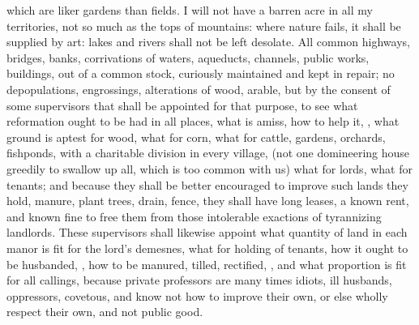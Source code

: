\etc{} which are liker gardens than fields. I will not have a barren acre in
all my territories, not so much as the tops of mountains: where nature fails,
it shall be supplied by art: lakes and rivers shall not be
left desolate. All common highways, bridges, banks, corrivations of waters,
aqueducts, channels, public works, buildings, \etc{} out of a
common stock, curiously maintained and kept in repair; no
depopulations, engrossings, alterations of wood, arable, but by the consent of
some supervisors that shall be appointed for that purpose, to see what
reformation ought to be had in all places, what is amiss, how to help it,
, what ground is
aptest for wood, what for corn, what for cattle, gardens, orchards, fishponds,
\etc{} with a charitable division in every village, (not one domineering house
greedily to swallow up all, which is too common with us) what for lords,
what for tenants; and because they shall be better
encouraged to improve such lands they hold, manure, plant trees, drain, fence,
\etc{} they shall have long leases, a known rent, and known fine to free them
from those intolerable exactions of tyrannizing landlords. These supervisors
shall likewise appoint what quantity of land in each manor is fit for the
lord's demesnes, what for holding of tenants, how it ought
to be husbanded, , how to be manured, tilled, rectified, , and what proportion is fit for all callings, because
private professors are many times idiots, ill husbands, oppressors, covetous,
and know not how to improve their own, or else wholly respect their own, and
not public good.

